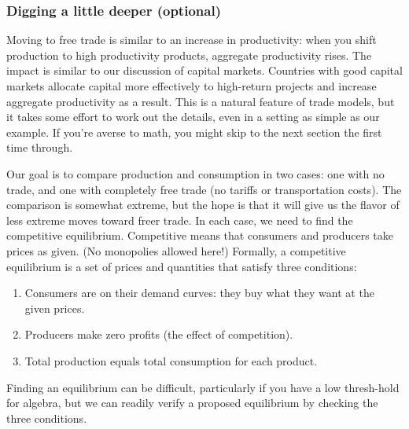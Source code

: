 \documentclass[letterpaper,12pt]{article}
\begin{document}
\subsubsection*{Digging a little deeper (optional)}

Moving to free trade is similar to an
increase in productivity:  when you shift production to high
productivity products, aggregate productivity rises.  The impact
is similar to our discussion of capital markets.  Countries with
good capital markets allocate capital more effectively to
high-return projects and increase aggregate productivity as a
result.  This is a natural feature of trade models, but it takes
some effort to work out the details, even in a setting as simple
as our example.  If you're averse to math, you might
skip to the next section the first time through.

Our goal is to compare production and consumption in two cases:
one with no trade, and one with completely free trade (no tariffs
or transportation costs).  The comparison is somewhat extreme, but
the hope is that it will give us the flavor of less extreme moves
toward freer trade.  In each case, we need to find the competitive
equilibrium.  Competitive means that consumers and producers
take prices as given.  (No monopolies allowed here!)
Formally, a competitive equilibrium is a set of prices and
quantities that satisfy three conditions:
%
\begin{enumerate}
\item Consumers are on their demand curves:  they buy what they
want at the given prices.

\item Producers make zero profits (the effect of competition).

\item Total production equals total consumption for each product.
\end{enumerate}

Finding an equilibrium can be difficult, particularly if you have
a low thresh-hold for algebra, but we can readily verify a
proposed equilibrium by checking the three conditions.
\end{document}
